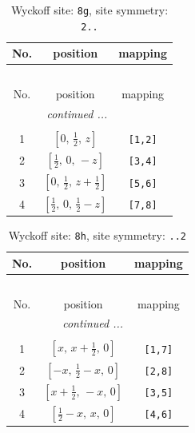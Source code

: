 \documentclass[fleqn,8pt]{jsarticle}
\begin{document}
\renewcommand{\arraystretch}{1.2}
\begin{longtable}{ccc}
\caption{Wyckoff site: {\tt 8g}, site symmetry: {\tt 2..}}
 \\
 \hline \hline
No. & position & mapping \\ \hline \endfirsthead

\multicolumn{2}{l}{\tablename\ \thetable{}} \\
 \hline \hline
No. & position & mapping \\ \hline \endhead

 \hline \hline
\multicolumn{2}{r}{\footnotesize\it continued ...} \\ \endfoot

 \hline \hline
\multicolumn{2}{r}{} \\ \endlastfoot

1 & $\left[ 0,\, \frac{1}{2},\, z \right]$ & {\tt [1,2]} \\ \hline
2 & $\left[ \frac{1}{2},\, 0,\, - z \right]$ & {\tt [3,4]} \\ \hline
3 & $\left[ 0,\, \frac{1}{2},\, z + \frac{1}{2} \right]$ & {\tt [5,6]} \\ \hline
4 & $\left[ \frac{1}{2},\, 0,\, \frac{1}{2} - z \right]$ & {\tt [7,8]} \\
\end{longtable}
\renewcommand{\arraystretch}{1.2}
\begin{longtable}{ccc}
\caption{Wyckoff site: {\tt 8h}, site symmetry: {\tt ..2}}
 \\
 \hline \hline
No. & position & mapping \\ \hline \endfirsthead

\multicolumn{2}{l}{\tablename\ \thetable{}} \\
 \hline \hline
No. & position & mapping \\ \hline \endhead

 \hline \hline
\multicolumn{2}{r}{\footnotesize\it continued ...} \\ \endfoot

 \hline \hline
\multicolumn{2}{r}{} \\ \endlastfoot

1 & $\left[ x,\, x + \frac{1}{2},\, 0 \right]$ & {\tt [1,7]} \\ \hline
2 & $\left[ - x,\, \frac{1}{2} - x,\, 0 \right]$ & {\tt [2,8]} \\ \hline
3 & $\left[ x + \frac{1}{2},\, - x,\, 0 \right]$ & {\tt [3,5]} \\ \hline
4 & $\left[ \frac{1}{2} - x,\, x,\, 0 \right]$ & {\tt [4,6]} \\
\end{longtable}
\end{document}
